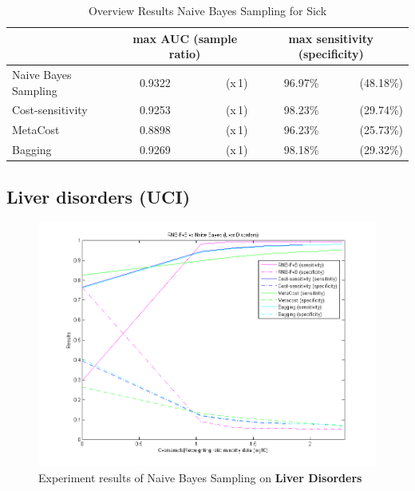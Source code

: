 \begin{table}[h]
\centering  
\begin{tabular}{ l | c r | r r|}                                      
& \multicolumn{2}{c}{max AUC (sample ratio)} & \multicolumn{2}{c}{max sensitivity (specificity)} \\
\hline 
Naive Bayes Sampling & 0.9322 & (x\,1) & 96.97\% & (48.18\%)\\
Cost-sensitivity & 0.9253 & (x\,1) & 98.23\% & (29.74\%)\\
MetaCost & 0.8898 & (x\,1) & 96.23\% & (25.73\%)\\
Bagging & 0.9269 & (x\,1) & 98.18\% & (29.32\%)\\
\hline                          %
\end{tabular}
\label{tab:PPer}
\caption{Overview Results Naive Bayes Sampling for Sick} %
\end{table}

\newpage
\subsection{Liver disorders (UCI)}
\begin{figure}[h]
\includegraphics[scale=0.65]{img/RNB-FvB-liverdisorder.png}
\caption{Experiment results of Naive Bayes Sampling on \textbf{Liver Disorders}}
\end{figure}

